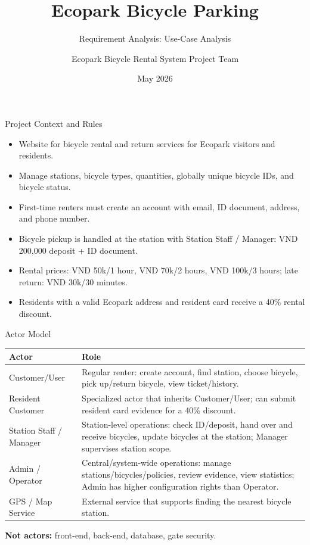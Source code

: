 \documentclass[aspectratio=169,10pt]{beamer}
\title{Ecopark Bicycle Parking}
\subtitle{Requirement Analysis: Use-Case Analysis}
\author{Ecopark Bicycle Rental System Project Team}
\date{May 2026}
\newcommand{\tightitems}{\setlength{\itemsep}{2pt}\setlength{\parskip}{0pt}}
\begin{document}
\begin{frame}
  \titlepage
\end{frame}

\begin{frame}{Project Context and Rules}
\small
\begin{itemize}\tightitems
  \item Website for bicycle rental and return services for Ecopark visitors and residents.
  \item Manage stations, bicycle types, quantities, globally unique bicycle IDs, and bicycle status.
  \item First-time renters must create an account with email, ID document, address, and phone number.
  \item Bicycle pickup is handled at the station with Station Staff / Manager: VND 200,000 deposit + ID document.
  \item Rental prices: VND 50k/1 hour, VND 70k/2 hours, VND 100k/3 hours; late return: VND 30k/30 minutes.
  \item Residents with a valid Ecopark address and resident card receive a 40\% rental discount.
\end{itemize}
\end{frame}

\begin{frame}{Actor Model}
\small
\begin{tabular}{p{}p{}}
\toprule
\textbf{Actor} & \textbf{Role} \\
\midrule
Customer/User & Regular renter: create account, find station, choose bicycle, pick up/return bicycle, view ticket/history. \\
Resident Customer & Specialized actor that inherits Customer/User; can submit resident card evidence for a 40\% discount. \\
Station Staff / Manager & Station-level operations: check ID/deposit, hand over and receive bicycles, update bicycles at the station; Manager supervises station scope. \\
Admin / Operator & Central/system-wide operations: manage stations/bicycles/policies, review evidence, view statistics; Admin has higher configuration rights than Operator. \\
GPS / Map Service & External service that supports finding the nearest bicycle station. \\
\bottomrule
\end{tabular}

\vspace{0.2cm}
\textbf{Not actors:} front-end, back-end, database, gate security.
\end{frame}
\end{document}
